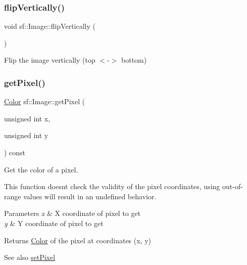 \subsubsection{\texorpdfstring{flipVertically()}{flipVertically()}}
{\footnotesize\ttfamily void sf\+::\+Image\+::flip\+Vertically (\begin{DoxyParamCaption}{ }\end{DoxyParamCaption})}



Flip the image vertically (top $<$-\/$>$ bottom) 

\begin{DoxyVerb}\end{DoxyVerb}
 \mbox{\label{classsf_1_1_image_acf278760458433b2c3626a6980388a95}} 
\subsubsection{\texorpdfstring{getPixel()}{getPixel()}}
{\footnotesize\ttfamily \mbox{\hyperlink{classsf_1_1_color}{Color}} sf\+::\+Image\+::get\+Pixel (\begin{DoxyParamCaption}\item[{unsigned int}]{x,  }\item[{unsigned int}]{y }\end{DoxyParamCaption}) const}



Get the color of a pixel. 

This function doesn\textquotesingle{}t check the validity of the pixel coordinates, using out-\/of-\/range values will result in an undefined behavior.


\begin{DoxyParams}{Parameters}
{\em x} & X coordinate of pixel to get \\
\hline
{\em y} & Y coordinate of pixel to get\\
\hline
\end{DoxyParams}
\begin{DoxyReturn}{Returns}
\mbox{\hyperlink{classsf_1_1_color}{Color}} of the pixel at coordinates (x, y)
\end{DoxyReturn}
\begin{DoxySeeAlso}{See also}
\mbox{\hyperlink{classsf_1_1_image_a9fd329b8cd7d4439e07fb5d3bb2d9744}{set\+Pixel}} \begin{DoxyVerb}\end{DoxyVerb}
 
\end{DoxySeeAlso}
\mbox{\label{classsf_1_1_image_ad9562b126fc8d5efcf608166992865c7}} 

